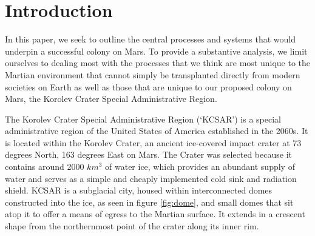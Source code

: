 \documentclass[fleqn,10pt]{Stylesheet} %
\affiliation{\textsuperscript{1}\textit{OrionVM}} %
\affiliation{\textsuperscript{2}\textit{Artist}} %
\affiliation{*\textbf{Corresponding author}: alex@asharp.id.au} %
\begin{document}
\flushbottom %
\maketitle %
\thispagestyle{empty} %


\section*{Introduction}
In this paper, we seek to outline the central processes and systems that would underpin a successful colony on Mars. To provide a substantive analysis, we limit ourselves to dealing most with the processes that we think are most unique to the Martian environment that cannot simply be transplanted directly from modern societies on Earth as well as those that are unique to our proposed colony on Mars, the Korolev Crater Special Administrative Region. 

The Korolev Crater Special Administrative Region (‘KCSAR’) is a special administrative region of the United States of America established in the 2060s. It is located within the Korolev Crater, an ancient ice-covered impact crater at 73 degrees North, 163 degrees East on Mars. The Crater was selected because it contains around 2000 $km^{3}$ of water ice, which provides an abundant supply of water and serves as a simple and cheaply implemented cold sink and radiation shield. KCSAR is a subglacial city, housed within interconnected domes constructed into the ice, as seen in figure \ref{fig:dome}, and small domes that sit atop it to offer a means of egress to the Martian surface. It extends in a crescent shape from the northernmost point of the crater along its inner rim.


\end{document}
